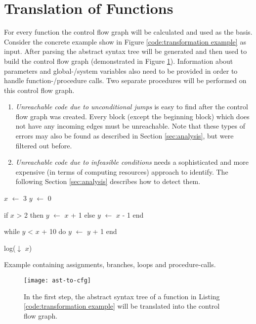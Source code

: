\section{Translation of Functions}
\label{sec:translation}
For every function the control flow graph will be calculated and used as the basis. 
Consider the concrete example show in Figure \ref{code:transformation example} as input. 
After parsing the abstract syntax tree will be generated and then used to build the control flow graph (demonstrated in Figure \ref{fig:ast to cfg}).
Information about parameters and global-/system variables also need to be provided in order to handle function-/procedure calls. 
Two separate procedures will be performed on this control flow graph.
\begin{enumerate}
	\item \emph{Unreachable code due to unconditional jumps} is easy to find after the control flow graph was created. Every block (except the beginning block) which does not have any incoming edges must be unreachable.
	Note that these types of errors may also be found as described in Section \ref{sec:analysis}, but were filtered out before.
	\item \emph{Unreachable code due to infeasible conditions} needs a sophisticated and more expensive (in terms of computing resources) approach to identify. The following Section \ref{sec:analysis} describes how to detect them.
\end{enumerate}

\begin{program}[h!]
	\begin{GenericCode}
$x$ $\leftarrow$ 3
$y$ $\leftarrow$ 0
		
if $x$ > 2 then
	$y$ $\leftarrow$ $x$ + 1
else
	$y$ $\leftarrow$ $x$ - 1
end
		
while $y$ < $x$ + 10 do
	$y$ $\leftarrow$ $y$ + 1
end
		
log($\downarrow$ $x$)\end{GenericCode}
	\caption{Example containing assignments, branches, loops and procedure-calls. }
	\label{code:transformation example}
\end{program}

\begin{figure}[h!]
	\centering
	\texttt{[image: ast-to-cfg]}
	\caption{In the first step, the abstract syntax tree of a function in Listing \ref{code:transformation example} will be translated into the control flow graph.}
	\label{fig:ast to cfg}
\end{figure}

